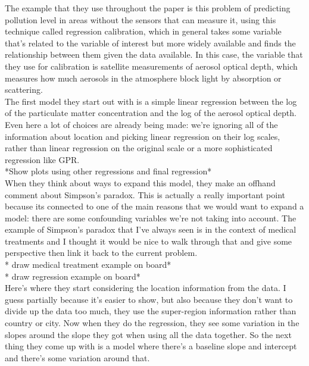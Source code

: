 \documentclass[]{article}
\begin{document}
The example that they use throughout the paper is this problem of predicting pollution level in areas without the sensors that can measure it, using this technique called regression calibration, which in general takes some variable that's related to the variable of interest but more widely available and finds the relationship between them given the data available. In this case, the variable that they use for calibration is satellite measurements of aerosol optical depth, which measures how much aerosols in the atmosphere block light by absorption or scattering.
\\

The first model they start out with is a simple linear regression between the log of the particulate matter concentration and the log of the aerosol optical depth. Even here a lot of choices are already being made: we're ignoring all of the information about location and picking linear regression on their log scales, rather than linear regression on the original scale or a more sophisticated regression like GPR.
\\

*Show plots using other regressions and final regression*
\\

When they think about ways to expand this model, they make an offhand comment about Simpson's paradox. This is actually a really important point because its connected to one of the main reasons that we would want to expand a model: there are some confounding variables we're not taking into account. The example of Simpson's paradox that I've always seen is in the context of medical treatments and I thought it would be nice to walk through that and give some perspective then link it back to the current problem.
\\

* draw medical treatment example on board*
\\

* draw regression example on board*
\\

Here's where they start considering the location information from the data. I guess partially because it's easier to show, but also because they don't want to divide up the data too much, they use the super-region information rather than country or city. Now when they do the regression, they see some variation in the slopes around the slope they got when using all the data together. So the next thing they come up with is a model where there's a baseline slope and intercept and there's some variation around that.
\\
\end{document}
